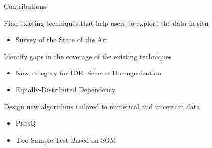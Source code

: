 \documentclass[10pt]{beamer}
\newcommand{\PresQ}[0]{\textsc{PresQ}\xspace}
\begin{document}




\begin{frame}{Contributions}

\begin{alertblock}{ Find existing techniques that help users to explore the data in situ}
    \begin{itemize}
        \item Survey of the State of the Art
    \end{itemize}
\end{alertblock}

\begin{alertblock}{ Identify gaps in the coverage of the existing techniques}
    \begin{itemize}
        \item New category for IDE: \alert{Schema Homogenization}
        \item Equally-Distributed Dependency
    \end{itemize}
\end{alertblock}

\begin{alertblock}{ Design new algorithms tailored to numerical and uncertain data}
    \begin{itemize}
        \item \PresQ
        \item Two-Sample Test Based on SOM
    \end{itemize}
\end{alertblock}

\end{frame}
\end{document}
